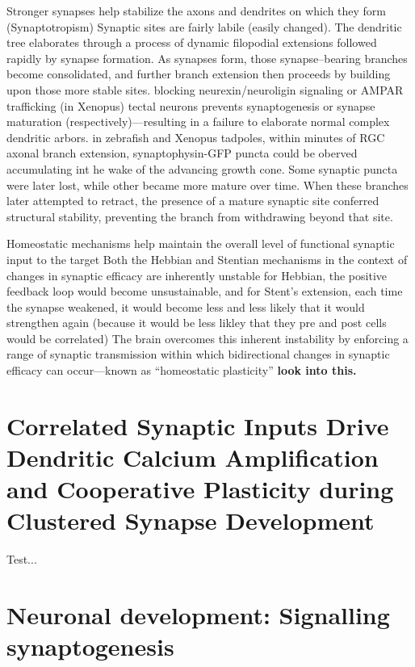\documentclass[11pt, a4paper, oneside]{article}   	%
\begin{document}
\begin{outline}
 \point Stronger synapses help stabilize the axons and dendrites on which they form (Synaptotropism)
    \subpoint Synaptic sites are fairly labile (easily changed). The dendritic tree elaborates through a process of dynamic filopodial extensions followed rapidly by synapse formation.
    \subpoint As synapses form, those synapse--bearing branches become consolidated, and further branch extension then proceeds by building upon those more stable sites.
        \subsubpoint blocking neurexin/neuroligin signaling or AMPAR trafficking (in Xenopus) tectal neurons prevents synaptogenesis or synapse maturation (respectively)---resulting in a failure to elaborate normal complex dendritic arbors.
    \subpoint in zebrafish and Xenopus tadpoles, within minutes of RGC axonal branch extension, synaptophysin-GFP puncta could be oberved accumulating int he wake of the advancing growth cone. Some synaptic puncta were later lost, while other became more mature over time. When these branches later attempted to retract, the presence of a mature synaptic site conferred structural stability, preventing the branch from withdrawing beyond that site.

 \point Homeostatic mechanisms help maintain the overall level of functional synaptic input to the target
    \subpoint Both the Hebbian and Stentian mechanisms in the context of changes in synaptic efficacy are inherently unstable
        \subsubpoint for Hebbian, the positive feedback loop would become unsustainable, and for Stent's extension, each time the synapse weakened, it would become less and less likely that it would strengthen again (because it would be less likley that they pre and post cells would be correlated)
    \subpoint The brain overcomes this inherent instability by enforcing a range of synaptic transmission within which bidirectional changes in synaptic efficacy can occur---known as ``homeostatic plasticity''
    \subsubpoint \textbf{look into this.}

\end{outline}

\section{Correlated Synaptic Inputs Drive Dendritic Calcium Amplification and Cooperative Plasticity during Clustered Synapse Development \cite{Lee2016}}

Test...

\section{Neuronal development: Signalling synaptogenesis \cite{Lewis2016}}
\end{document}
